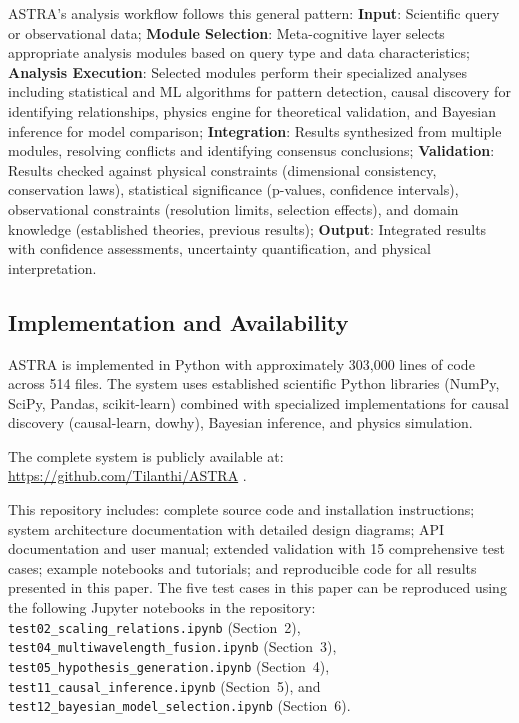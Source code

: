 \documentclass[usenatbib]{rasti}
\begin{document}
ASTRA's analysis workflow follows this general pattern: \textbf{Input}: Scientific query or observational data; \textbf{Module Selection}: Meta-cognitive layer selects appropriate analysis modules based on query type and data characteristics; \textbf{Analysis Execution}: Selected modules perform their specialized analyses including statistical and ML algorithms for pattern detection, causal discovery for identifying relationships, physics engine for theoretical validation, and Bayesian inference for model comparison; \textbf{Integration}: Results synthesized from multiple modules, resolving conflicts and identifying consensus conclusions; \textbf{Validation}: Results checked against physical constraints (dimensional consistency, conservation laws), statistical significance (p-values, confidence intervals), observational constraints (resolution limits, selection effects), and domain knowledge (established theories, previous results); \textbf{Output}: Integrated results with confidence assessments, uncertainty quantification, and physical interpretation.

\subsection{Implementation and Availability}

ASTRA is implemented in Python with approximately 303,000 lines of code across 514 files. The system uses established scientific Python libraries (NumPy, SciPy, Pandas, scikit-learn) combined with specialized implementations for causal discovery (causal-learn, dowhy), Bayesian inference, and physics simulation.

The complete system is publicly available at: \url{https://github.com/Tilanthi/ASTRA} \cite{astra_github}.

This repository includes: complete source code and installation instructions; system architecture documentation with detailed design diagrams; API documentation and user manual; extended validation with 15 comprehensive test cases; example notebooks and tutorials; and reproducible code for all results presented in this paper. The five test cases in this paper can be reproduced using the following Jupyter notebooks in the repository: \texttt{test02\_scaling\_relations.ipynb} (Section~2), \texttt{test04\_multiwavelength\_fusion.ipynb} (Section~3), \texttt{test05\_hypothesis\_generation.ipynb} (Section~4), \texttt{test11\_causal\_inference.ipynb} (Section~5), and \texttt{test12\_bayesian\_model\_selection.ipynb} (Section~6).
\end{document}

